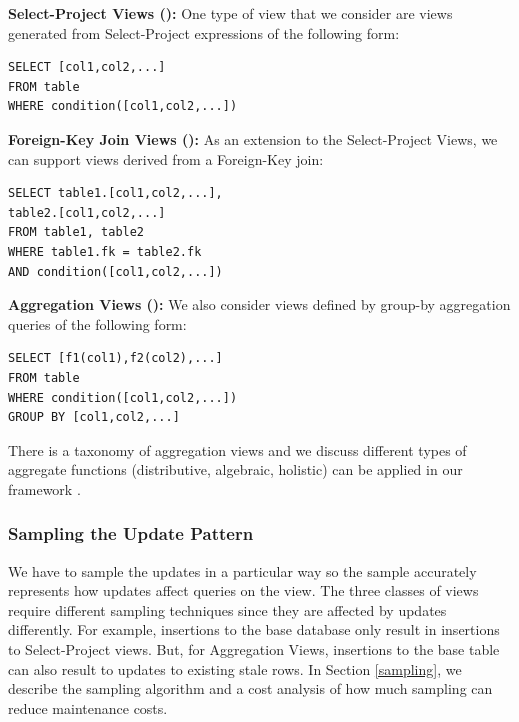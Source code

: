\noindent\textbf{Select-Project Views (\spview): } One type of view that we consider are views generated from Select-Project
expressions of the following form:

\begin{lstlisting}
SELECT [col1,col2,...] 
FROM table 
WHERE condition([col1,col2,...]) 
\end{lstlisting}

\vspace{1em}

\noindent\textbf{Foreign-Key Join Views (\fjview): } As an extension to the Select-Project Views, we can support views derived from a Foreign-Key join:

\begin{lstlisting}
SELECT table1.[col1,col2,...], 
table2.[col1,col2,...]
FROM table1, table2 
WHERE table1.fk = table2.fk 
AND condition([col1,col2,...]) 
\end{lstlisting}

\vspace{1em}

\noindent\textbf{Aggregation Views (\aggview): } We also consider views defined by group-by aggregation queries of the following form:

\begin{lstlisting}
SELECT [f1(col1),f2(col2),...] 
FROM table 
WHERE condition([col1,col2,...]) 
GROUP BY [col1,col2,...]
\end{lstlisting}

There is a taxonomy of aggregation views and we discuss different types of aggregate functions (distributive, algebraic, holistic) can be applied in our framework .

\subsubsection{Sampling the Update Pattern}
We have to sample the updates in a particular way so the sample accurately represents how updates
affect queries on the view. 
The three classes of views require different sampling techniques since they are affected by updates differently.
For example, insertions to the base database only result in insertions to Select-Project views.
But, for Aggregation Views, insertions to the base table can also result to updates to existing stale rows.
In Section \ref{sampling}, we describe the sampling algorithm and a cost analysis of how much sampling can reduce maintenance costs.

